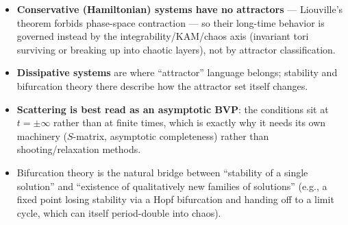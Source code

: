 \documentclass[11pt]{article}
\begin{document}
\begin{itemize}[leftmargin=*]
  \item \textbf{Conservative (Hamiltonian) systems have no attractors}
  --- Liouville's theorem forbids phase-space contraction --- so their
  long-time behavior is governed instead by the
  integrability/KAM/chaos axis (invariant tori surviving or breaking
  up into chaotic layers), not by attractor classification.
  \item \textbf{Dissipative systems} are where ``attractor'' language
  belongs; stability and bifurcation theory there describe how the
  attractor set itself changes.
  \item \textbf{Scattering is best read as an asymptotic BVP}: the
  conditions sit at $t = \pm\infty$ rather than at finite times, which
  is exactly why it needs its own machinery ($S$-matrix, asymptotic
  completeness) rather than shooting/relaxation methods.
  \item Bifurcation theory is the natural bridge between ``stability
  of a single solution'' and ``existence of qualitatively new families
  of solutions'' (e.g., a fixed point losing stability via a Hopf
  bifurcation and handing off to a limit cycle, which can itself
  period-double into chaos).
\end{itemize}
\end{document}
